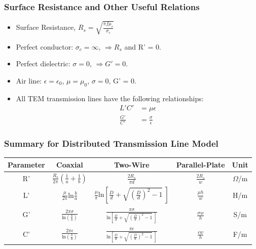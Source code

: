 \documentclass[a4paper]{article}
\begin{document}
\subsubsection{Surface Resistance and Other Useful Relations}
\begin{itemize}
    \item Surface Resistance, $R_s = \sqrt{\displaystyle\frac{\pi f\mu_c}{\sigma_c}}$
    \item Perfect conductor: $\sigma_c = \infty$, $\Rightarrow R_s$ and R' = 0.
    \item Perfect dielectric: $\sigma = 0$, $\Rightarrow G' = 0$.
    \item Air line:  $\epsilon = \epsilon_0$, $\mu = \mu_0$, $\sigma = 0$, G' = 0.
    \item All TEM transmission lines have the following relationships:
    \begin{align*}
        L'C' &= \mu\epsilon\\
        \frac{G'}{C'} &= \frac{\sigma}{\epsilon}
    \end{align*}
\end{itemize}

\subsubsection{Summary for Distributed Transmission Line Model}
\begin{table}[H]
\setcellgapes{5pt}
\centering\makegapedcells
\begin{tabular}{|c|c|c|c|c|}
\hline
\textbf{Parameter} & \textbf{Coaxial} & \textbf{Two-Wire} & \textbf{Parallel-Plate} & \textbf{Unit} \\ \hline
R' & $\displaystyle\frac{R_s}{2\pi}\left(\frac{1}{a}+\frac{1}{b}\right)$ & $\displaystyle\frac{2R_s}{\pi d}$ & $\displaystyle\frac{2R_s}{w}$     & $\Omega$/m    \\ \hline
L' & $\displaystyle\frac{\mu}{2\pi}\text{ln}\frac{b}{a}$ & $\displaystyle\frac{\mu}{\pi}\text{ln}\left[\frac{D}{d}+\sqrt{\left(\frac{D}{d}\right)^2-1}\ \right]$ & $\displaystyle\frac{\mu h}{w}$ & H/m           \\ \hline
G' & $\displaystyle\frac{2\pi\sigma}{\text{ln}\left(\displaystyle\frac{b}{a}\right)}$ & $\displaystyle\frac{\pi\sigma}{\text{ln}\left[\displaystyle\frac{D}{d}+\sqrt{\left(\displaystyle\frac{D}{d}\right)^2-1}\ \right]}$ & $\displaystyle\frac{\sigma w}{h}$ & S/m           \\ \hline
C' &   $\displaystyle\frac{2\pi\epsilon}{\text{ln}\left(\displaystyle\frac{b}{a}\right)}$ &  $\displaystyle\frac{\pi\epsilon}{\text{ln}\left[\displaystyle\frac{D}{d}+\sqrt{\left(\displaystyle\frac{D}{d}\right)^2-1}\ \right]}$ &  $\displaystyle\frac{\epsilon w}{h}$ & F/m           \\ \hline
\end{tabular}
\end{table}
\end{document}
